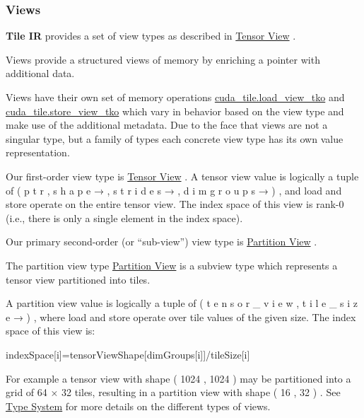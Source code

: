 \documentclass{article}
\begin{document}
\subsubsection{Views}

\textbf{Tile IR} provides a set of view types as described in \href{https://docs.nvidia.com/cuda/tile-ir/latest/sections/types.html#type-views}{Tensor View} .


Views provide a structured views of memory by enriching a pointer with additional data.

Views have their own set of memory operations \href{https://docs.nvidia.com/cuda/tile-ir/latest/sections/operations.html#op-cuda-tile-load-view-tko}{cuda\_tile.load\_view\_tko} and \href{https://docs.nvidia.com/cuda/tile-ir/latest/sections/operations.html#op-cuda-tile-store-view-tko}{cuda\_tile.store\_view\_tko} which vary in behavior based on the view type and make use of the additional metadata. Due to the face that views are not a singular type, but a family of types each concrete view type has its own value representation.


Our first-order view type is \href{https://docs.nvidia.com/cuda/tile-ir/latest/sections/types.html#type-tensor-view}{Tensor View} . A tensor view value is logically a tuple of ( p t r , s h a p e → , s t r i d e s → , d i m g r o u p s → ) , and load and store operate on the entire tensor view. The index space of this view is rank-0 (i.e., there is only a single element in the index space).


Our primary second-order (or ``sub-view'') view type is \href{https://docs.nvidia.com/cuda/tile-ir/latest/sections/types.html#type-partition-view}{Partition View} .


The partition view type \href{https://docs.nvidia.com/cuda/tile-ir/latest/sections/types.html#type-partition-view}{Partition View} is a subview type which represents a tensor view partitioned into tiles.

A partition view value is logically a tuple of ( t e n s o r \_ v i e w , t i l e \_ s i z e → ) , where load and store operate over tile values of the given size. The index space of this view is:


indexSpace[i]=tensorViewShape[dimGroups[i]]/tileSize[i]

For example a tensor view with shape ( 1024 , 1024 ) may be partitioned into a grid of 64 × 32 tiles, resulting in a partition view with shape ( 16 , 32 ) . See \href{https://docs.nvidia.com/cuda/tile-ir/latest/sections/types.html#section-types}{Type System} for more details on the different types of views.
\end{document}
